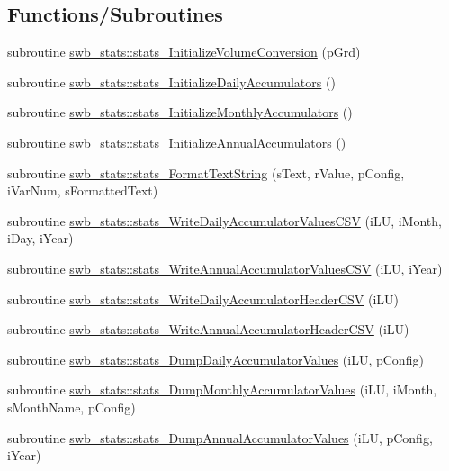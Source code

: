 \subsection*{Functions/Subroutines}
\begin{DoxyCompactItemize}
\item 
subroutine \hyperlink{namespaceswb__stats_a310f0f7b08aa679de6907fc3870bac76}{swb\_\-stats::stats\_\-InitializeVolumeConversion} (pGrd)
\item 
subroutine \hyperlink{namespaceswb__stats_a5ba844557dec513710f283c41a9a265c}{swb\_\-stats::stats\_\-InitializeDailyAccumulators} ()
\item 
subroutine \hyperlink{namespaceswb__stats_a3d947e5ebbe4b649820b9de1e118efb0}{swb\_\-stats::stats\_\-InitializeMonthlyAccumulators} ()
\item 
subroutine \hyperlink{namespaceswb__stats_a5fbf4ac0d23ffb2a7aa6dbe4be8c8164}{swb\_\-stats::stats\_\-InitializeAnnualAccumulators} ()
\item 
subroutine \hyperlink{namespaceswb__stats_a07fff21d7f416822a1e78b4de9580fc7}{swb\_\-stats::stats\_\-FormatTextString} (sText, rValue, pConfig, iVarNum, sFormattedText)
\item 
subroutine \hyperlink{namespaceswb__stats_a7680fbd498a0bf44089b1e12baf9221a}{swb\_\-stats::stats\_\-WriteDailyAccumulatorValuesCSV} (iLU, iMonth, iDay, iYear)
\item 
subroutine \hyperlink{namespaceswb__stats_affd85de02d34bd4608aec046a8a28a57}{swb\_\-stats::stats\_\-WriteAnnualAccumulatorValuesCSV} (iLU, iYear)
\item 
subroutine \hyperlink{namespaceswb__stats_ae8dd9a43d8d8b6499f5b0556f4d7f374}{swb\_\-stats::stats\_\-WriteDailyAccumulatorHeaderCSV} (iLU)
\item 
subroutine \hyperlink{namespaceswb__stats_a702b2071b18f3bf1b5569bcf5b6bef3e}{swb\_\-stats::stats\_\-WriteAnnualAccumulatorHeaderCSV} (iLU)
\item 
subroutine \hyperlink{namespaceswb__stats_a0d9031a1acff05d4d1e6d46d8c4e3263}{swb\_\-stats::stats\_\-DumpDailyAccumulatorValues} (iLU, pConfig)
\item 
subroutine \hyperlink{namespaceswb__stats_a2d6e66544a4b71402f6bb7075d590df8}{swb\_\-stats::stats\_\-DumpMonthlyAccumulatorValues} (iLU, iMonth, sMonthName, pConfig)
\item 
subroutine \hyperlink{namespaceswb__stats_a65f35b2efbf53e65d819a171319d92f9}{swb\_\-stats::stats\_\-DumpAnnualAccumulatorValues} (iLU, pConfig, iYear)
\item 

\end{DoxyCompactItemize}
